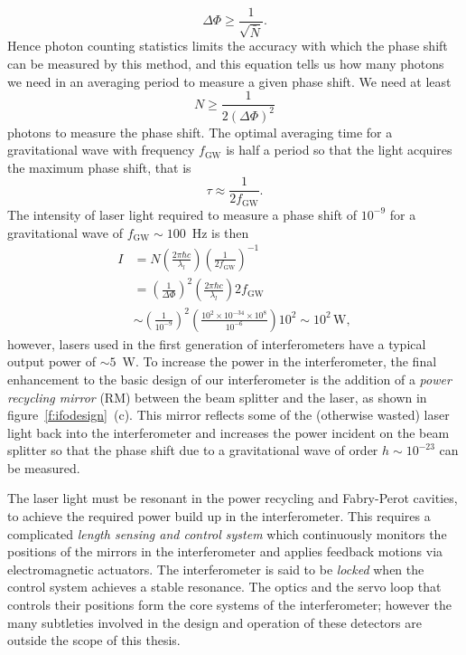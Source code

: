 \begin{equation}
\Delta \Phi \ge \frac{1}{\sqrt{\bar{N}}}.
\end{equation}
Hence photon counting statistics limits the accuracy with which the phase
shift can be measured by this method, and this equation tells us how many
photons we need in an averaging period to measure a given phase shift. We need
at least
\begin{equation}
N \ge \frac{1}{2 \left(\Delta\Phi\right)^2}
\end{equation}
photons to measure the phase shift. The optimal averaging time for a
gravitational wave with frequency $f_\mathrm{GW}$ is half a period so that the
light acquires the maximum phase shift, that is
\begin{equation}
\tau \approx \frac{1}{2 f_\mathrm{GW}}.
\end{equation}
The intensity of laser light required to measure a phase shift of $10^{-9}$
for a gravitational wave of $f_\mathrm{GW} \sim 100$~Hz is then
\begin{equation}
\begin{split}
I &= N \left(\frac{2 \pi \hbar c}{\lambda_l}\right) \left( \frac{1}{2 f_\mathrm{GW}}
\right)^{-1} \\
&= \left(\frac{1}{\Delta\Phi}\right)^2 \left(\frac{2 \pi \hbar c}{\lambda_l}\right) 2 f_\mathrm{GW} \\
&\sim \left(\frac{1}{10^{-9}}\right)^2 \left(\frac{10^2 \times 10^{-34} \times
10^{8}}{10^{-6}}\right) 10^2 \sim 10^2\,
\mathrm{W},
\end{split}
\end{equation}
however, lasers used in the first generation of interferometers have a typical
output power of $\sim 5$~W. To increase the power in the interferometer, the
final enhancement to the basic design of our interferometer is the addition of a
\emph{power recycling mirror} (RM) between the beam splitter and the laser, as
shown in figure~\ref{f:ifodesign}~(c). This mirror reflects some of the
(otherwise wasted) laser light back into the interferometer and increases the
power incident on the beam splitter so that the phase shift due to a
gravitational wave of order $h \sim 10^{-23}$ can be measured.

The laser light must be resonant in the power recycling and Fabry-Perot
cavities, to achieve the required power build up in the interferometer. This
requires a complicated \emph{length sensing and control
system}\cite{Fritschel:2001} which continuously monitors the positions of the
mirrors in the interferometer and applies feedback motions via electromagnetic
actuators. The interferometer is said to be \emph{locked} when the control
system achieves a stable resonance. The optics and the servo loop that
controls their positions form the core systems of the interferometer; however
the many subtleties involved in the design and operation of these detectors
are outside the scope of this thesis.

